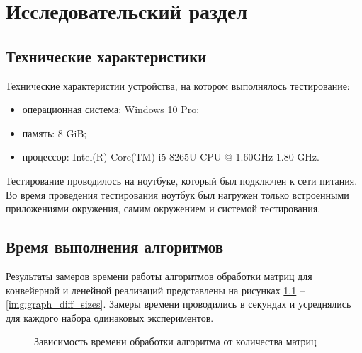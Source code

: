 \chapter{Исследовательский раздел}
\section{Технические характеристики}
Технические характеристии устройства, на котором выполнялось тестирование:
\begin{itemize}
	\item операционная система: Windows 10 Pro;
	\item память: 8 GiB;
	\item процессор: Intel(R) Core(TM) i5-8265U CPU @ 1.60GHz   1.80 GHz.
\end{itemize}
Тестирование проводилось на ноутбуке, который был подключен к сети питания. Во время проведения тестирования ноутбук был нагружен только встроенными приложениями окружения, самим окружением и системой тестирования.

\section{Время выполнения алгоритмов}

Результаты замеров времени работы алгоритмов обработки матриц для конвейерной и ленейной реализаций представлены на рисунках \ref{img:graph_diff_quantities} -- \ref{img:graph_diff_sizes}. Замеры времени проводились в секундах и усреднялись для каждого набора одинаковых экспериментов.

\begin{figure}[H]
	\hspace*{-1cm}
	\centering
	\caption{Зависимость времени обработки алгоритма от количества матриц } 
	\label{img:graph_diff_quantities}
\end{figure} 


